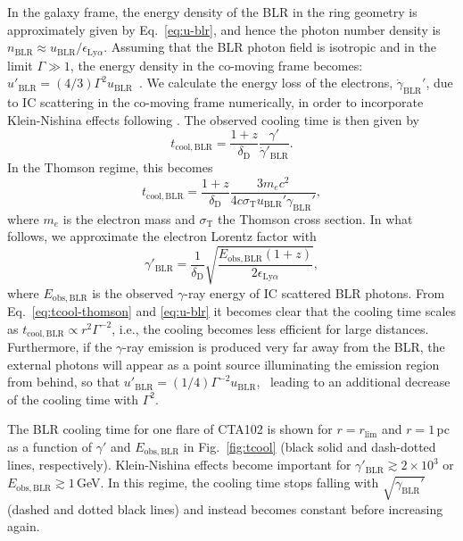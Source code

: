 \documentclass[twocolumn]{aastex62}
\newcommand{\gray}{$\gamma$-ray\xspace}
\begin{document}
In the galaxy frame, the energy density of the BLR in the ring geometry is approximately given by Eq.~\ref{eq:u-blr}, and hence the photon number density is $n_\mathrm{BLR} \approx u_\mathrm{BLR} / \epsilon_{\mathrm{Ly}\alpha}$.
Assuming that the BLR photon field is isotropic and in the limit $\Gamma \gg 1$, the energy density in the co-moving frame becomes:
$u'_\mathrm{BLR} = (4/3)\Gamma^2 u_\mathrm{BLR}$~\citep{1994ApJS...90..945D,2002ApJ...575..667D}.
We calculate the energy loss of the electrons, $\dot{\gamma}_\mathrm{BLR}'$, due to IC scattering in the co-moving frame numerically, in order to incorporate Klein-Nishina   effects following \citet{1970RvMP...42..237B}.
The observed cooling time is then given by
\begin{equation}
    t_\mathrm{cool,BLR} = \frac{1 + z}{\delta_\mathrm{D}} \frac{\gamma'}{\dot{\gamma}'_\mathrm{BLR}}.
\end{equation}
In the Thomson regime, this becomes
\begin{equation}
    t_\mathrm{cool,BLR} = \frac{1+z}{\delta_\mathrm{D}}\frac{3m_ec^2}{4c\sigma_\mathrm{T}u_\mathrm{BLR}'\gamma_\mathrm{BLR}'},
    \label{eq:tcool-thomson}
\end{equation}
where $m_e$ is the electron mass and $\sigma_\mathrm{T}$ the Thomson cross section. 
In what follows, we approximate the electron Lorentz factor with~\citep[e.g.,][]{2009herb.book.....D,finke2016}
\begin{equation}
    \gamma'_\mathrm{BLR} = \frac{1}{ \delta_\mathrm{D}}\sqrt{\frac{E_\mathrm{obs,BLR}(1+z)}{2\epsilon_{\mathrm{Ly}\alpha}}},
\end{equation}
where $E_\mathrm{obs,BLR}$ is the observed \gray energy of IC scattered BLR photons. 
From Eq.~\ref{eq:tcool-thomson} and \ref{eq:u-blr} it becomes clear that the cooling time scales as $t_\mathrm{cool, BLR}\propto r^2 \Gamma^{-2}$, i.e., the cooling becomes less efficient for large distances. 
Furthermore, if the \gray emission is produced very far away from the BLR, the external photons will appear as a point source illuminating the emission region from behind, so that $u'_\mathrm{BLR} = (1/4)\Gamma^{-2} u_\mathrm{BLR}$,~\citep{1994ApJS...90..945D} leading to an additional decrease of the cooling time with $\Gamma^2$.

The BLR cooling time for one flare of CTA102 is shown for $r=r_\mathrm{lim}$ and $r = 1\,$pc as a function of $\gamma'$ and $E_\mathrm{obs,BLR}$ in Fig.~\ref{fig:tcool} (black solid and dash-dotted lines, respectively). 
Klein-Nishina effects become important for $\gamma'_\mathrm{BLR} \gtrsim 2\times10^3$ or $E_\mathrm{obs,BLR}\gtrsim1\,$GeV. 
In this regime, the cooling time stops falling with $\sqrt{\gamma_\mathrm{BLR}'}$ (dashed and dotted black lines) and instead becomes constant before increasing again.  
\end{document}
